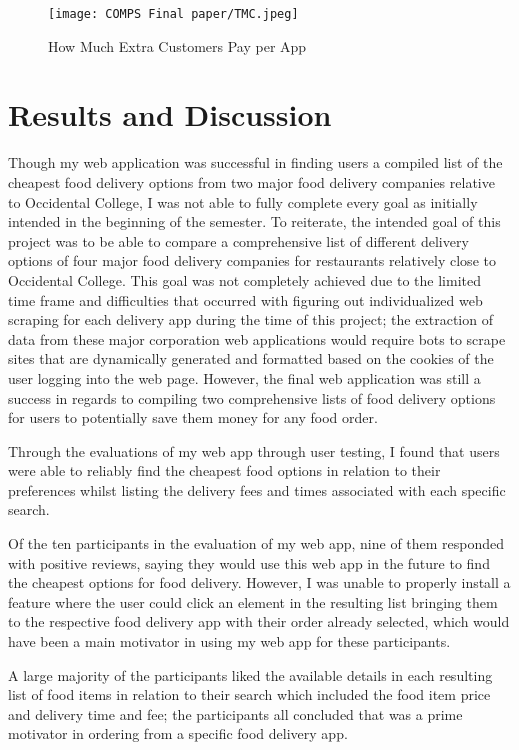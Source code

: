 \documentclass[10pt,twocolumn]{article}
\begin{document}
\begin{figure}
    \centering
    \texttt{[image: COMPS Final paper/TMC.jpeg]}
    \caption{
        How Much Extra Customers Pay per App
    }
    \label{fig:second-page-5}
\end{figure}

\section{Results and Discussion}

Though my web application was successful in finding users a compiled list of the cheapest food delivery options from two major food delivery companies relative to Occidental College, I was not able to fully complete every goal as initially intended in the beginning of the semester. To reiterate, the intended goal of this project was to be able to compare a comprehensive list of different delivery options of four major food delivery companies for restaurants relatively close to Occidental College. This goal was not completely achieved due to the limited time frame and difficulties that occurred with figuring out individualized web scraping for each delivery app during the time of this project; the extraction of data from these major corporation web applications would require bots to scrape sites that are dynamically generated and formatted based on the cookies of the user logging into the web page. However, the final web application was still a success in regards to compiling two comprehensive lists of food delivery options for users to potentially save them money for any food order. 

Through the evaluations of my web app through user testing, I found that users were able to reliably find the cheapest food options in relation to their preferences whilst listing the delivery fees and times associated with each specific search.

Of the ten participants in the evaluation of my web app, nine of them responded with positive reviews, saying they would use this web app in the future to find the cheapest options for food delivery. However, I was unable to properly install a feature where the user could click an element in the resulting list bringing them to the respective food delivery app with their order already selected, which would have been a main motivator in using my web app for these participants.

A large majority of the participants liked the available details in each resulting list of food items in relation to their search which included the food item price and delivery time and fee; the participants all concluded that was a prime motivator in ordering from a specific food delivery app.
\end{document}
